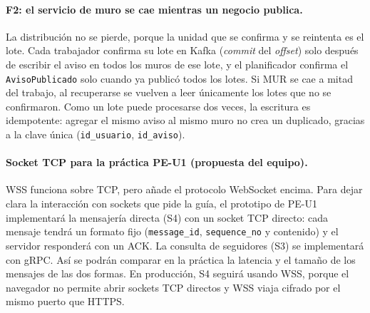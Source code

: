 \paragraph{F2: el servicio de muro se cae mientras un negocio publica.}
La distribución no se pierde, porque la unidad que se confirma y se reintenta es el lote.
Cada trabajador confirma su lote en Kafka (\emph{commit} del \emph{offset}) solo después
de escribir el aviso en todos los muros de ese lote, y el planificador confirma el
\texttt{AvisoPublicado} solo cuando ya publicó todos los lotes. Si MUR se cae a mitad del
trabajo, al recuperarse se vuelven a leer únicamente los lotes que no se confirmaron. Como
un lote puede procesarse dos veces, la escritura es idempotente: agregar el mismo aviso al
mismo muro no crea un duplicado, gracias a la clave única (\texttt{id\_usuario},
\texttt{id\_aviso}).

\paragraph{Socket TCP para la práctica PE-U1 (propuesta del equipo).}
WSS funciona sobre TCP, pero añade el protocolo WebSocket encima. Para dejar clara la
interacción con sockets que pide la guía, el prototipo de PE-U1 implementará la
mensajería directa (S4) con un socket TCP directo: cada mensaje tendrá un formato fijo
(\texttt{message\_id}, \texttt{sequence\_no} y contenido) y el servidor responderá con un
ACK. La consulta de seguidores (S3) se implementará con gRPC. Así se podrán comparar en la
práctica la latencia y el tamaño de los mensajes de las dos formas. En producción, S4
seguirá usando WSS, porque el navegador no permite abrir sockets TCP directos y WSS viaja
cifrado por el mismo puerto que HTTPS.

